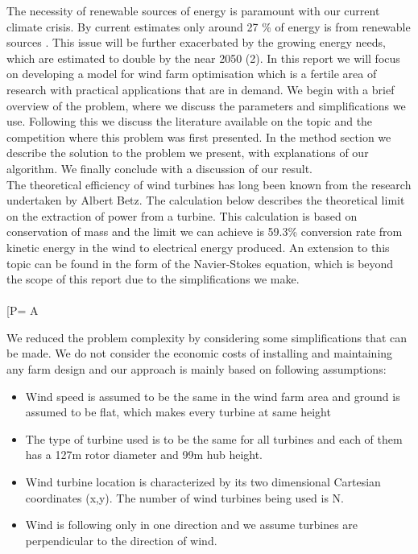 \documentclass{article}
\begin{document}
The necessity of renewable sources of energy is paramount with our current climate crisis. By current estimates only around 27 {\%} of energy is from renewable sources \supercite{einstein}. This issue will be further exacerbated by the growing energy needs, which are estimated to double by the near 2050 (2). In this report we will focus on developing a model for wind farm optimisation which is a fertile area of research with practical applications that are in demand. We begin with a brief overview of the problem, where we discuss the parameters and simplifications we use. Following this we discuss the literature available on the topic and the competition where this problem was first presented. In the method section we describe the solution to the problem we present, with explanations of our algorithm. We finally conclude with a discussion of our result.
\newline
\\
The theoretical efficiency of wind turbines has long been known from the research undertaken by Albert Betz. The calculation below describes the theoretical limit on the extraction of power from a turbine. This calculation is based on conservation of mass and the limit we can achieve is 59.3{\%} conversion rate from kinetic energy in the wind to electrical energy produced. An extension to this topic can be found in the form of the Navier-Stokes equation, which is beyond the scope of this report due to the simplifications we make.
\\
\\[P= \thinspace \rho {}A\]

We reduced the problem complexity by considering some simplifications that can be made. We do not consider the economic costs of installing and maintaining any farm design and our approach is mainly based on following assumptions:
\begin{itemize}
  \item	Wind speed is assumed to be the same in the wind farm area and ground is assumed to be flat, which makes every turbine at same height
  \item The type of turbine used is to be the same for all turbines and each of them has a 127{m} rotor diameter and 99{m} hub height.
  \item Wind turbine location is characterized by its two dimensional Cartesian coordinates (x,y). The number of wind turbines being used is N.
  \item Wind is following only in one direction and we assume turbines are perpendicular to the direction of wind.
\end{itemize}
\end{document}
